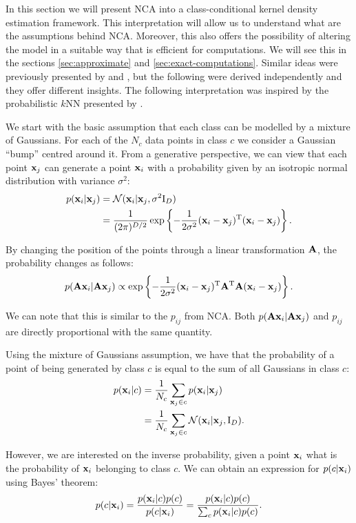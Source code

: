In this section we will present NCA into a class-conditional kernel density estimation framework. This interpretation will allow us to understand what are the assumptions behind NCA. Moreover, this also offers the possibility of altering the model in a suitable way that is efficient for computations. We will see this in the sections \ref{sec:approximate} and \ref{sec:exact-computations}. Similar ideas were previously presented by and , but the following were derived independently and they offer different insights. The following interpretation was inspired by the probabilistic $k$NN presented by \citet{barber2011}.

We start with the basic assumption that each class can be modelled by a mixture of Gaussians. For each of the $N_c$ data points in class $c$ we consider a Gaussian ``bump'' centred around it. From a generative perspective, we can view that each point $\mathbf{x}_j$ can generate a point $\mathbf{x}_i$ with a probability given by an isotropic normal distribution with variance $\sigma^2$:
\begin{align}
	p(\mathbf{x}_i|\mathbf{x}_j) &= \mathcal{N}(\mathbf{x}_i|\mathbf{x}_j, \sigma^2\mathrm{I}_D) \\
				   &= \frac{1}{(2\pi)^{D/2}}\exp \left\{-\frac{1}{2\sigma^2} (\mathbf{x}_i - \mathbf{x}_j)^\mathrm{T}(\mathbf{x}_i - \mathbf{x}_j)\right\}.
\end{align}

By changing the position of the points through a linear transformation $\mathbf{A}$, the probability changes as follows:
\begin{align}
	p(\mathbf{A}\mathbf{x}_i|\mathbf{A}\mathbf{x}_j) \propto \exp \left\{-\frac{1}{2\sigma^2} (\mathbf{x}_i - \mathbf{x}_j)^\mathrm{T}\mathbf{A}^\mathrm{T}\mathbf{A}(\mathbf{x}_i - \mathbf{x}_j)\right\}.
\end{align}

We can note that this is similar to the $p_{ij}$ from NCA. Both $p(\mathbf{A}\mathbf{x}_i|\mathbf{A}\mathbf{x}_j)$ and $p_{ij}$ are directly proportional with the same quantity.

Using the mixture of Gaussians assumption, we have that the probability of a point of being generated by class $c$ is equal to the sum of all Gaussians in class $c$:
\begin{align}
	p(\mathbf{x}_i|c) &= \frac{1}{N_c}\sum_{\mathbf{x}_j \in c} p(\mathbf{x}_i|\mathbf{x}_j)\\
			   &= \frac{1}{N_c}\sum_{\mathbf{x}_j \in c} \mathcal{N}(\mathbf{x}_i|\mathbf{x}_j, \mathrm{I}_D).
\end{align}

However, we are interested on the inverse probability, given a point $\mathbf{x}_i$ what is the probability of $\mathbf{x}_i$ belonging to class $c$. We can obtain an expression for $p(c|\mathbf{x}_i)$ using Bayes' theorem:
\begin{align}
	p(c|\mathbf{x}_i) = \frac{p(\mathbf{x}_i|c)p(c)}{p(c|\mathbf{x}_i)} = \frac{p(\mathbf{x}_i|c)p(c)}{\sum_{c} p(\mathbf{x}_i|c)p(c)}.
\end{align}


